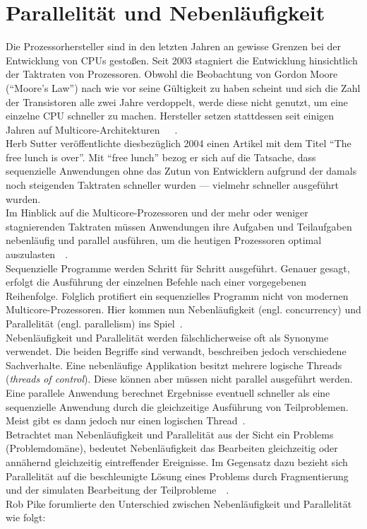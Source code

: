 \pagebreak

\section{Parallelität und Nebenläufigkeit}
Die Prozessorhersteller sind in den letzten Jahren an gewisse Grenzen bei der Entwicklung von CPUs gestoßen. Seit 2003 stagniert die Entwicklung hinsichtlich der Taktraten von Prozessoren. Obwohl die Beobachtung von Gordon Moore (\enquote{Moore's Law}) nach wie vor seine Gültigkeit zu haben scheint und sich die Zahl der Transistoren alle zwei Jahre verdoppelt, werde diese nicht genutzt, um eine einzelne CPU schneller zu machen. Hersteller setzen stattdessen seit einigen Jahren auf Multicore-Architekturen~\cite[S.~1]{butcher_seven_2014}~\cite[S.~108]{vernon_reactive_2016}~\cite{sutter_free_2004}.\\
Herb Sutter veröffentlichte diesbezüglich 2004 einen Artikel mit dem Titel \enquote{The free lunch is over}. Mit \enquote{free lunch} bezog er sich auf die Tatsache, dass sequenzielle Anwendungen ohne das Zutun von Entwicklern aufgrund der damals noch steigenden Taktraten schneller wurden --- vielmehr schneller ausgeführt wurden.\\
Im Hinblick auf die Multicore-Prozessoren und der mehr oder weniger stagnierenden Taktraten müssen Anwendungen ihre Aufgaben und Teilaufgaben nebenläufig und parallel ausführen, um die heutigen Prozessoren optimal auszulasten~\cite{sutter_free_2004}~\cite[S.~1]{butcher_seven_2014}.\\
Sequenzielle Programme werden Schritt für Schritt ausgeführt. Genauer gesagt, erfolgt die Ausführung der einzelnen Befehle nach einer vorgegebenen Reihenfolge. Folglich protifiert ein sequenzielles Programm nicht von modernen Multicore-Prozessoren. Hier kommen nun Nebenläufigkeit (engl. concurrency) und Parallelität (engl. parallelism) ins Spiel~\cite[S.~3]{butcher_seven_2014}.\\

Nebenläufigkeit und Parallelität werden fälschlicherweise oft als Synonyme verwendet. Die beiden Begriffe sind verwandt, beschreiben jedoch verschiedene Sachverhalte. Eine nebenläufige Applikation besitzt mehrere logische Threads (\textit{threads of control}). Diese können aber müssen nicht parallel ausgeführt werden. Eine parallele Anwendung berechnet Ergebnisse eventuell schneller als eine sequenzielle Anwendung durch die gleichzeitige Ausführung von Teilproblemen. Meist gibt es dann jedoch nur einen logischen Thread~\cite[S.~1]{butcher_seven_2014}.\\
Betrachtet man Nebenläufigkeit und Parallelität aus der Sicht ein Problems (Problemdomäne), bedeutet Nebenläufigkeit das Bearbeiten gleichzeitig oder annähernd gleichzeitig eintreffender Ereignisse. Im Gegensatz dazu bezieht sich Parallelität auf die beschleunigte Lösung eines Problems durch Fragmentierung und der simulaten Bearbeitung der Teilprobleme~\cite[S.~2]{butcher_seven_2014}~\cite[S.~15]{vernon_reactive_2016}.\\
Rob Pike forumlierte den Unterschied zwischen Nebenläufigkeit und Parallelität wie folgt:


